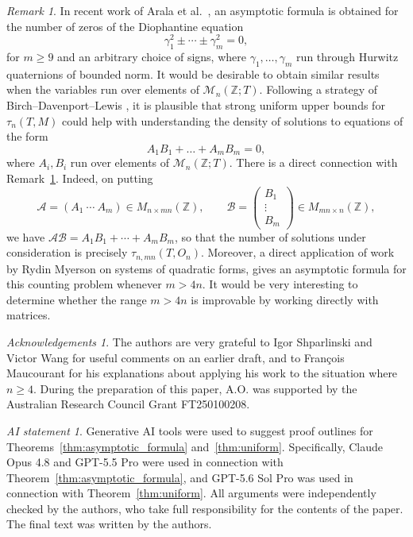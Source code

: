 \documentclass[11pt,reqno]{amsart}
\theoremstyle{definition}
\theoremstyle{remark}
\newtheorem{remark}[thm]{Remark}
\newtheorem*{ack}{Acknowledgements}
\newtheorem*{AI}{AI statement}
\numberwithin{equation}{section}
\numberwithin{thm}{section}
\numberwithin{table}{section}
\newcommand{\ZZ}{\mathbb Z}
\begin{document}
\begin{remark}\label{rem:nonabeliancircle}
In recent work of Arala et al.\ \cite{arala}, an asymptotic formula is obtained for the number of 
zeros of the Diophantine equation
$$
 \gamma_1^2\pm \cdots \pm \gamma_m^2=0,
$$
for $m\geq 9$ and an arbitrary choice of signs, where $\gamma_1,\dots,\gamma_m$ run through Hurwitz quaternions of bounded norm.  It would be desirable to obtain similar results when the variables run over elements of $\mathcal{M}_n(\ZZ;T)$. Following a strategy of Birch--Davenport--Lewis \cite{BDL}, it is plausible that strong uniform upper bounds for $\tau_n(T,M)$ could help with 
understanding the density of solutions to equations of the form 
$$
A_1B_1 + \dots + A_mB_m = 0,
$$
where $A_i,B_i$ run over elements of $\mathcal{M}_n(\ZZ;T)$.
There is a direct connection with Remark~\ref{rem:nonabeliancircle}.  Indeed, on putting
\[
 \mathcal A=(A_1\ \cdots\ A_m)\in M_{n\times mn}(\mathbb Z),
 \qquad
 \mathcal B=
 \begin{pmatrix}
 B_1\\ \vdots\\ B_m
 \end{pmatrix}
 \in M_{mn\times n}(\mathbb Z),
\]
we have
$ \mathcal A\mathcal B=A_1B_1+\cdots+A_mB_m$, so that  the number of solutions under consideration is precisely
$\tau_{n,mn}(T,O_n)$.  Moreover, a direct application of work by Rydin Myerson
\cite[Theorem~1.2]{simon}  on systems of quadratic forms, 
gives an asymptotic formula 
for this counting problem whenever $m>4n$.  
It would be very interesting to determine whether 
the range $m>4n$ is improvable by working directly with matrices. 
\end{remark}




\begin{ack}
The authors are very grateful to 
Igor Shparlinski and Victor Wang for useful comments on an earlier draft, and to 
Fran\c{c}ois
 Maucourant  for his explanations about applying his work 
\cite{Mau} to the situation where $n\geq 4$.
During the preparation of this paper,  A.O. was supported by the Australian Research Council Grant FT250100208.
\end{ack}

\begin{AI}
Generative AI tools were used to suggest proof outlines for
Theorems~\ref{thm:asymptotic_formula} and~\ref{thm:uniform}.
Specifically, Claude Opus 4.8 and GPT-5.5 Pro were used in connection
with Theorem~\ref{thm:asymptotic_formula}, and GPT-5.6 Sol Pro was
used in connection with Theorem~\ref{thm:uniform}. All arguments
were independently checked by the authors, who take full
responsibility for the contents of the paper. The final text was
written by the authors.
\end{AI}
\end{document}
